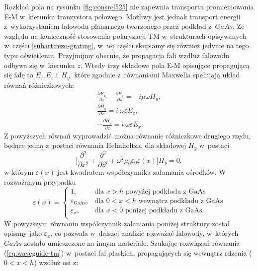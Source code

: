 Rozkład pola na rysunku \ref{fig:consrcl525} nie zapewnia transportu promieniowania E-M w~kierunku tranzystora polowego. Możliwy jest jednak transport energii z~wykorzystaniem falowodu planarnego tworzonego przez podkład z~$GaAs$. Ze względu na konieczność stosowania polaryzacji TM w~strukturach opisywanych w~części \ref{subart:rezo-grating}, w~tej części skupiamy się również jedynie na tego typu oświetleniu. Przyjmijmy obecnie, że propagacja fali wzdłuż falowodu odbywa się w~kierunku $z$. Wtedy trzy składowe pola E-M opisujące propagującą się falę to $E_x$,$E_z$ i~$H_y$, które zgodnie z~równaniami Maxwella spełniają układ równań różniczkowych:
\begin{equation}
\begin{gathered}
	\frac{\partial E_x}{\partial z} - \frac{\partial E_z}{\partial x} = -i \mu \omega H_y,\\	
	\frac{\partial H_y}{\partial x} = i~\omega \varepsilon E_z, \\
	- \frac{\partial H_y}{\partial z} = i~\omega \varepsilon E_x.
\end{gathered}
\end{equation}
Z powyższych równań wyprowadzić można równanie różniczkowe drugiego rzędu, będące jedną z~postaci równania Helmholtza, dla składowej $H_y$ w~postaci
\begin{equation}
	\Bigg[ \frac{\partial^2}{\partial x^2} + \frac{\partial^2}{\partial z^2} + \omega^2 \mu_0 \varepsilon_0 \varepsilon (x) \Bigg] H_y = 0,
	\label{eq:waveguide-tm}
\end{equation}
w którym $\varepsilon(x)$ jest kwadratem współczynnika załamania ośrodków. W rozważanym przypadku
\begin{equation}
\varepsilon(x)=  
\begin{cases} 
	1, & \mbox{dla } x>h\mbox{ powyżej podkładu z~GaAs } \\ 
	\varepsilon_{\textrm{GaAs}}, & \mbox{dla } 0<x<h\mbox{ wewnątrz podkładu z~GaAs} \\
	\varepsilon_x,	&	\mbox{dla } x<0\mbox{ poniżej podkładu z~GaAs}.\\
\end{cases}
\end{equation}
W powyższym równaniu współczynnik załamania poniżej struktury został opisany jako $\varepsilon_x$, co pozwala w~dalszej analizie rozważać falowody, w~których $GaAs$ zostało umieszczone na innym materiale. Szukając rozwiązań równania (\ref{eq:waveguide-tm}) w~postaci fal płaskich, propagujących się wewnątrz rdzenia ($0<x<h$) wzdłuż osi z:
